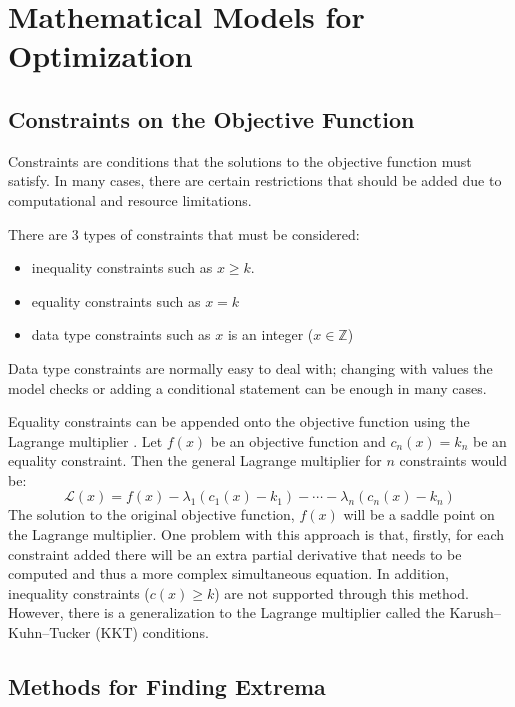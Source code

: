 \documentclass[10pt,a4paper]{report}
\begin{document}
	\chapter{Mathematical Models for Optimization}

		\section{Constraints on the Objective Function}
			Constraints are conditions that the solutions to the objective function must satisfy. In many cases, there are
			certain restrictions that should be added due to computational and resource limitations. \par
			There are 3 types of constraints that must be considered:
			\begin{itemize}
				\item inequality constraints such as $x \geq k$.
				\item equality constraints such as $x = k$
				\item data type constraints such as $x$ is an integer ($x \in \mathbb{Z}$)
			\end{itemize}
			Data type constraints are normally easy to deal with; changing with values the model checks or adding a conditional statement
			can be enough in many cases. \par
			Equality constraints can be appended onto the objective function using the Lagrange multiplier \autocite{LagrangeMultiplier}. Let
			$f(x)$ be an objective function and $c_{n}(x) = k_n$ be an equality constraint. Then the general Lagrange multiplier for $n$ constraints would be:
			\begin{equation}
				\mathcal{L} (x) = f(x) - \lambda_1(c_{1}(x) - k_1) - \cdots - \lambda_n(c_{n}(x) - k_n)
			\end{equation}
			The solution to the original objective function, $f(x)$ will be a saddle point on the Lagrange multiplier. One problem with this
			approach is that, firstly, for each constraint added there will be an extra partial derivative that needs to be computed and thus a more
			complex simultaneous equation. In addition, inequality constraints ($c(x) \geq k$) are not supported through this method. However, there
			is a generalization to the Lagrange multiplier called the Karush–Kuhn–Tucker (KKT) conditions.

		\section{Methods for Finding Extrema}
\end{document}
